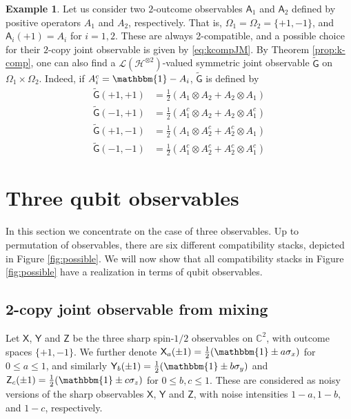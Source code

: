 \documentclass[12pt]{amsart}
\theoremstyle{definition}
\newtheorem{example}{Example}
\newcommand{\CC}{\mathbb C} %
\newcommand{\half}{\tfrac{1}{2}} %
\newcommand{\hi}{\mathcal{H}} %
\newcommand{\elle}[1]{\mathcal{L}(#1)} %
\newcommand{\id}{\mathbbm{1}} %
\newcommand{\A}{\mathsf{A}}%
\newcommand{\G}{\mathsf{G}}%
\newcommand{\X}{\mathsf{X}}%
\newcommand{\Y}{\mathsf{Y}}%
\newcommand{\Z}{\mathsf{Z}}%
\begin{document}
\begin{example}
Let us consider two $2$-outcome observables $\A_1$ and $\A_2$ defined by positive operators $A_1$ and $A_2$, respectively. That is, $\Omega_1 = \Omega_2 = \{+1,-1\}$, and $\A_i(+1) = A_i$ for $i=1,2$. These are always 2-compatible, and a possible choice for their $2$-copy joint observable is given by \eqref{eq:kcompJM}. By Theorem \ref{prop:k-comp}, one can also find a \(\elle{\hi^{\otimes 2}} \)-valued symmetric joint observable \(\widetilde{\G}\) on \(\Omega_1\times\Omega_2\).
Indeed, if \(A_i^c=\id - A_i\), \(\widetilde{\G}\) is defined by 
\begin{align*}
\widetilde{\G}(+1,+1) & = \frac{1}{2}\left(A_1\otimes A_2 + A_2\otimes A_1\right)
 \\%
\widetilde{\G}(-1,+1) & = \frac{1}{2}\left(A_1^c\otimes A_2 + A_2\otimes A_1^c \right)\\
\widetilde{\G}(+1,-1) & = \frac{1}{2}\left(A_1\otimes A_2^c +A_2^c\otimes A_1 \right)
\\%
\widetilde{\G}(-1,-1)& = \frac{1}{2}\left(A_1^c\otimes A_2^c +A_2^c\otimes A_1^c \right)
 \end{align*}
\end{example}


\section{Three qubit observables}
\label{sec:qubitcase}

In this section we concentrate on the case of three observables.
Up to permutation of observables, there are six different compatibility stacks, depicted in Figure \ref{fig:possible}.
We will now show that all compatibility stacks in Figure \ref{fig:possible} have a realization in terms of qubit observables.

\subsection{2-copy joint observable from mixing }%


Let $\X$, $\Y$ and $\Z$ be the three sharp spin-$1/2$ observables on \(\CC^2\), with outcome spaces $\{+1,-1\}$.
We further denote $\X_a(\pm 1) = \half ( \id \pm a \sigma_x)$ for $0\leq a \leq 1$, and similarly $\Y_b(\pm 1) = \half ( \id \pm b \sigma_y)$ and $\Z_c(\pm 1) = \half ( \id \pm c \sigma_z)$ for $0\leq b,c \leq 1$.
These are considered as noisy versions of the sharp observables $\X$, $\Y$ and $\Z$, with noise intensities \(1-a,1-b,\) and \(1-c\), respectively.
\end{document}
